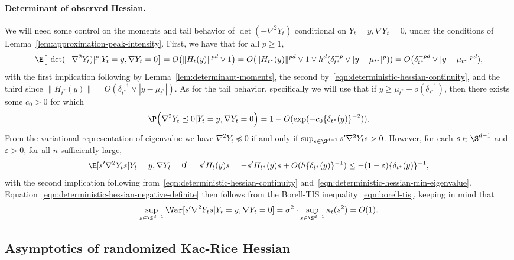 \documentclass{article}
\begin{document}
	\paragraph{Determinant of observed Hessian.}
	We will need some control on the moments and tail behavior of $\det(-\nabla^2 Y_{t})$ conditional on $Y_{t} = y, \nabla Y_{t} = 0$, under the conditions of Lemma~\ref{lem:approximation-peak-intensity}. First, we have that for all $p \geq 1$, 
	\begin{equation}
		\label{eqn:deterministic-hessian-determinant-moments}
		\E\big[|\det(-\nabla^2 Y_t)|^p|Y_t = y,\nabla Y_t = 0\big] = O\big(\|H_t(y)\|^{pd} \vee 1\big) = O\big(\|H_{t^*}(y)\|^{pd} \vee 1 \vee h^{d}(\delta_{t^*}^{-p} \vee |y - \mu_{t^*}|^p)) = O\big(\delta_{t^*}^{-pd} \vee |y - \mu_{t^*}|^{pd}),
	\end{equation}
	with the first implication following by Lemma~\ref{lem:determinant-moments}, the second by~\eqref{eqn:deterministic-hessian-continuity}, and the third since $\|H_{t^*}(y)\| = O(\delta_{t^*}^{-1} \vee |y - \mu_{t^*}|)$.
	As for the tail behavior, specifically we will use that if $y \geq \mu_{t^*} - o(\delta_{t^*}^{-1})$, then there exists some $c_0 > 0$ for which
	\begin{equation}
		\label{eqn:deterministic-hessian-negative-definite}
		\P\Big(\nabla^2 Y_t \preceq 0|Y_t = y,\nabla Y_t = 0\Big) = 1 - O(\exp(-c_0\{\delta_{t^*}(y)\}^{-2})).
	\end{equation}
	From the variational representation of eigenvalue we have $\nabla^2 Y_t \not\preceq 0$ if and only if $\sup_{s \in \S^{d - 1}} s'\nabla^2 Y_ts > 0$. However, for each $s \in \S^{d - 1}$ and $\varepsilon > 0$, for all $n$ sufficiently large,
	\begin{equation}
		\E[s'\nabla^2 Y_t s|Y_t = y,\nabla Y_t = 0] = s'H_t(y)s = -s' H_{t^*}(y)s + O(h\{\delta_{t^*}(y)\}^{-1}) \leq -(1 - \varepsilon)\{\delta_{t^*}(y)\}^{-1},
	\end{equation}
	with the second implication following from~\eqref{eqn:deterministic-hessian-continuity} and~\eqref{eqn:deterministic-hessian-min-eigenvalue}. Equation~\eqref{eqn:deterministic-hessian-negative-definite} then follows from the Borell-TIS inequality~\eqref{eqn:borell-tis}, keeping in mind that 
	$$
	\sup_{s \in \S^{d - 1}} \Var[s'\nabla^2 Y_t s|Y_t = y,\nabla Y_t = 0] = \sigma^2 \cdot \sup_{s \in \S^{d - 1}}\kappa_{t}(s^2) = O(1).
	$$
	
	\subsection{Asymptotics of randomized Kac-Rice Hessian}
	\label{subsec:randomized-hessian-asymptotics}
	
\end{document}
